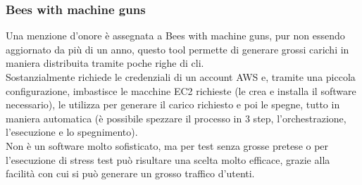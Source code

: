 \subsubsection{Bees with machine guns}
Una menzione d’onore è assegnata a Bees with machine guns, pur non essendo aggiornato da più di un anno, questo tool permette di generare grossi carichi in maniera distribuita tramite poche righe di \gls{cli}.\\
Sostanzialmente richiede le credenziali di un account AWS e, tramite una piccola configurazione, imbastisce le macchine EC2 richieste (le crea e installa il software necessario), le utilizza per generare il carico richiesto e poi le spegne, tutto in maniera automatica (è possibile spezzare il processo in 3 step, l’orchestrazione, l’esecuzione e lo spegnimento).\\
Non è un software molto sofisticato, ma per test senza grosse pretese o per l'esecuzione di stress test può risultare una scelta molto efficace,  grazie alla facilità con cui si può generare un grosso traffico d'utenti. 
